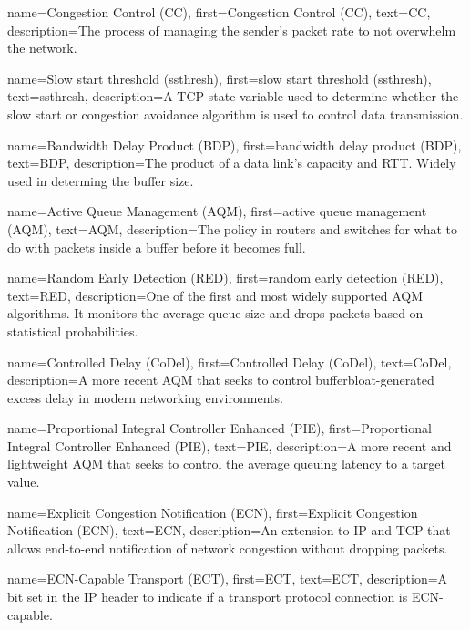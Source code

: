 {
    name={Congestion Control (CC)},
    first={Congestion Control (CC)},
    text={CC},
    description={The process of managing the sender's packet rate to not overwhelm the network.}
}

{
    name={Slow start threshold (ssthresh)},
    first={slow start threshold (ssthresh)},
    text={ssthresh},
    description={A TCP state variable used to determine whether the slow start or congestion avoidance algorithm is used to control data transmission.}
}

{
    name={Bandwidth Delay Product (BDP)},
    first={bandwidth delay product (BDP)},
    text={BDP},
    description={The product of a data link's capacity and RTT. Widely used in determing the buffer size.}
}

{
    name={Active Queue Management (AQM)},
    first={active queue management (AQM)},
    text={AQM},
    description={The policy in routers and switches for what to do with packets inside a buffer before it becomes full.}
}

{
    name={Random Early Detection (RED)},
    first={random early detection (RED)},
    text={RED},
    description={One of the first and most widely supported AQM algorithms. It monitors the average queue size and drops packets based on statistical probabilities.}
}

{
    name={Controlled Delay (CoDel)},
    first={Controlled Delay (CoDel)},
    text={CoDel},
    description={A more recent AQM that seeks to control bufferbloat-generated excess delay in modern
    networking environments.}
}

{
    name={Proportional Integral Controller Enhanced (PIE)},
    first={Proportional Integral Controller Enhanced (PIE)},
    text={PIE},
    description={A more recent and lightweight AQM that seeks to control the average queuing latency to a target value.}
}

{
    name={Explicit Congestion Notification (ECN)},
    first={Explicit Congestion Notification (ECN)},
    text={ECN},
    description={An extension to IP and TCP that allows end-to-end notification of network congestion without dropping packets.}
}

{
    name={ECN-Capable Transport (ECT)},
    first={ECT},
    text={ECT},
    description={A bit set in the IP header to indicate if a transport protocol connection is ECN-capable.}
}

